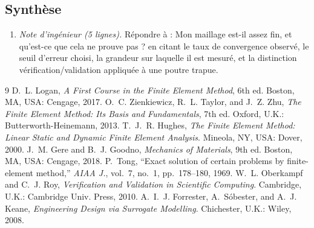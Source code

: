 \documentclass[10pt,journal]{IEEEtran}
\begin{document}
\subsection{Synthèse}
\begin{enumerate}[leftmargin=1.4em]
\item \emph{Note d'ingénieur (5 lignes).} Répondre à : \og Mon maillage est-il assez fin, et qu'est-ce que cela ne prouve pas ?\fg{} en citant le taux de convergence observé, le seuil d'erreur choisi, la grandeur sur laquelle il est mesuré, et la distinction vérification/validation appliquée à une poutre trapue.
\end{enumerate}

\begin{thebibliography}{9}
 D.~L. Logan, \emph{A First Course in the Finite Element Method}, 6th ed. Boston, MA, USA: Cengage, 2017.
 O.~C. Zienkiewicz, R.~L. Taylor, and J.~Z. Zhu, \emph{The Finite Element Method: Its Basis and Fundamentals}, 7th ed. Oxford, U.K.: Butterworth-Heinemann, 2013.
 T.~J.~R. Hughes, \emph{The Finite Element Method: Linear Static and Dynamic Finite Element Analysis}. Mineola, NY, USA: Dover, 2000.
 J.~M. Gere and B.~J. Goodno, \emph{Mechanics of Materials}, 9th ed. Boston, MA, USA: Cengage, 2018.
 P.~Tong, ``Exact solution of certain problems by finite-element method,'' \emph{AIAA J.}, vol.~7, no.~1, pp.~178--180, 1969.
 W.~L. Oberkampf and C.~J. Roy, \emph{Verification and Validation in Scientific Computing}. Cambridge, U.K.: Cambridge Univ. Press, 2010.
 A.~I.~J. Forrester, A.~Sóbester, and A.~J. Keane, \emph{Engineering Design via Surrogate Modelling}. Chichester, U.K.: Wiley, 2008.
\end{thebibliography}
\end{document}
